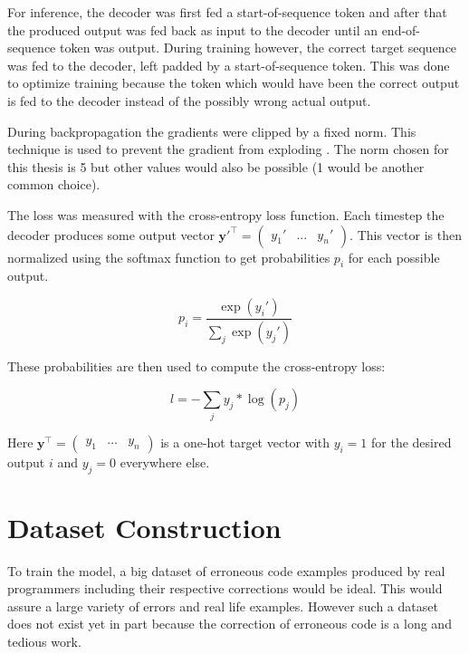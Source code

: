 For inference, the decoder was first fed a start-of-sequence token and after that the produced output was fed back as input to the decoder until an end-of-sequence token was output. During training however, the correct target sequence was fed to the decoder, left padded by a start-of-sequence token. This was done to optimize training because the token which would have been the correct output is fed to the decoder instead of the possibly wrong actual output.

 During backpropagation the gradients were clipped by a fixed norm. This technique is used to prevent the gradient from exploding \cite{gradient_clipping}. The norm chosen for this thesis is 5 but other values would also be possible (1 would be another common choice).

 The loss was measured with the cross-entropy loss function. Each timestep the decoder produces some output vector \(\mathbf{y}'^\intercal = \begin{pmatrix} y_1' & ... & y_n'\end{pmatrix}\). This vector is then normalized using the softmax function to get probabilities \(p_i\) for each possible output.

 \begin{equation*}
   p_i = \frac
             {\exp(y_i')}
             {\sum_{j} \exp(y_j')}
 \end{equation*}

 These probabilities are then used to compute the cross-entropy loss:

 \begin{equation*}
   l = - \sum_{j} y_j * \log(p_j)
 \end{equation*}

 Here \(\mathbf{y}^\intercal = \begin{pmatrix} y_1 & ... & y_n \end{pmatrix}\) is a one-hot target vector with \(y_i = 1\) for the desired output \(i\) and \(y_j = 0\) everywhere else.

\section{Dataset Construction}

To train the model, a big dataset of erroneous code examples produced by real programmers including their respective corrections would be ideal. This would assure a large variety of errors and real life examples. However such a dataset does not exist yet in part because the correction of erroneous code is a long and tedious work.

